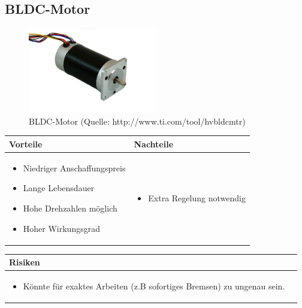 \pagebreak

\subsection{BLDC-Motor}

\begin{figure}[h!]%
\centering
\includegraphics[width=0.5\textwidth]{fig/blcd.jpg}
\caption{BLDC-Motor (Quelle: http://www.ti.com/tool/hvbldcmtr)}
\label{fig:Java}
\end{figure}

\begin{table}[h]
\begin{tabular}{p{} | p{}}


 \textbf{Vorteile} & \textbf{Nachteile} \\ \hline
	 
\begin{itemize}
\item Niedriger Anschaffungspreis
\item Lange Lebensdauer
\item Hohe Drehzahlen möglich
\item Hoher Wirkungsgrad
\end{itemize}

 
 &
 
\begin{itemize}
\item Extra Regelung notwendig
\end{itemize}

\end{tabular}
\end{table}

\begin{table}[h]
\begin{tabular}{p{}p{}}


 \textbf{Risiken} & \\ \hline
	 
\begin{itemize}
\item Könnte für exaktes Arbeiten (z.B sofortiges Bremsen) zu ungenau sein.
\end{itemize}

 
\end{tabular}
\end{table}

\pagebreak